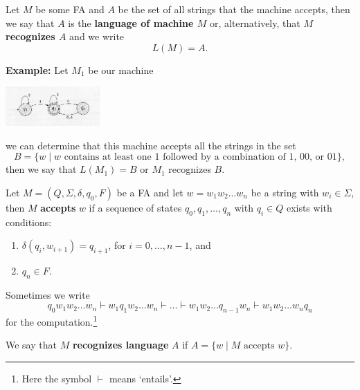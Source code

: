 \documentclass[a4paper,blends,pdf,colorBG,slideColor]{prosper}
\begin{document}
Let $M$ be some FA and $A$ be the set of all strings that the machine accepts, then we 
say that $A$ is the {\bf language of machine $M$} or, alternatively, that
{\bf $M$ recognizes $A$} and we write
\[
L(M) = A.
\]

{\bf Example:} Let $M_1$ be our machine
\begin{center}
    \includegraphics[height=15mm]{images/FA-01.eps}
\end{center}
we can determine that this machine accepts all the strings in the set
\[
B = \{ w \mid \mbox{$w$ contains at least one $1$ followed by a combination of $1$, $00$, or $01$}\},
\]
then we say that $L(M_1) = B$ or $M_1$ recognizes $B$.
\es

Let $M = (Q, \Sigma, \delta, q_0, F)$ be a FA and let $w = w_1 w_2 \ldots w_n$
be a string  with $w_i \in \Sigma$, then $M$ {\bf accepts} $w$
if a sequence of states $q_0, q_1, \ldots, q_n$ with $q_i \in Q$ exists with conditions:
\begin{enumerate}
\item $\delta(q_i, w_{i+1}) = q_{i+1}$, for $i = 0, \ldots, n-1$, and
\item $q_n \in F$.
\end{enumerate}

Sometimes we write
\[
q_0 w_1 w_2 \ldots w_n \vdash  w_1 q_1 w_2 \ldots w_n \vdash  \ldots  \vdash 
 w_1 w_2 \ldots q_{n-1}w_n \vdash  w_1 w_2 \ldots w_n q_n
\]
for the computation.\footnote{Here the symbol $\vdash$ means `entails'.}

We say that $M$ {\bf recognizes language} $A$ if $A = \{w \mid M \mbox{ accepts } w\}$.

\vspace{.3in}

\es
\end{document}
